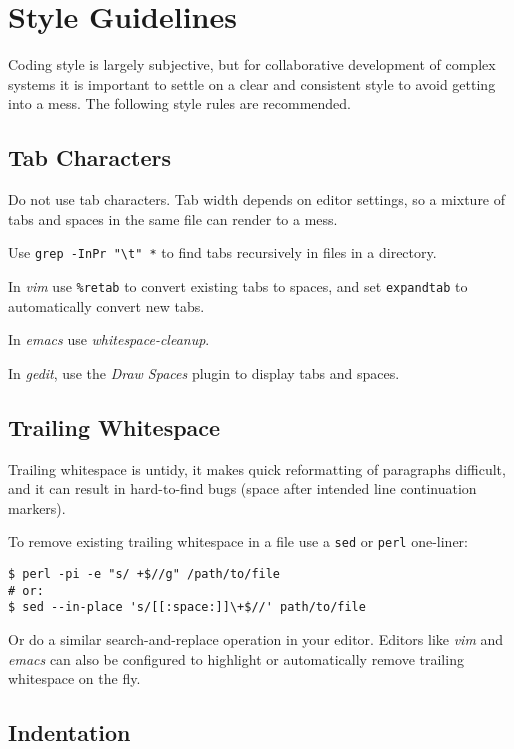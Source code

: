 \section{Style Guidelines}

Coding style is largely subjective, but for collaborative development of
complex systems it is important to settle on a clear and consistent style to
avoid getting into a mess. The following style rules are recommended.

\subsection{Tab Characters}

Do not use tab characters. Tab width depends on editor settings, so a mixture
of tabs and spaces in the same file can render to a mess.

Use \lstinline=grep -InPr "\t" *= to find tabs recursively in files in
a directory.

In {\em vim} use \lstinline=%retab= to convert existing tabs to spaces, 
and set \lstinline=expandtab= to automatically convert new tabs. 

In {\em emacs} use {\em whitespace-cleanup}.

In {\em gedit}, use the {\em Draw Spaces} plugin to display tabs and spaces.

\subsection{Trailing Whitespace}

Trailing whitespace is untidy, it makes quick reformatting of paragraphs
difficult, and it can result in hard-to-find bugs (space after intended
line continuation markers).

To remove existing trailing whitespace in a file use a \lstinline=sed= or
\lstinline=perl= one-liner:

\lstset{language=sh}
\begin{lstlisting}
$ perl -pi -e "s/ +$//g" /path/to/file
# or:
$ sed --in-place 's/[[:space:]]\+$//' path/to/file
\end{lstlisting}

Or do a similar search-and-replace operation in your editor. Editors like {\em
vim} and {\em emacs} can also be configured to highlight or automatically
remove trailing whitespace on the fly.
    
\subsection{Indentation}

